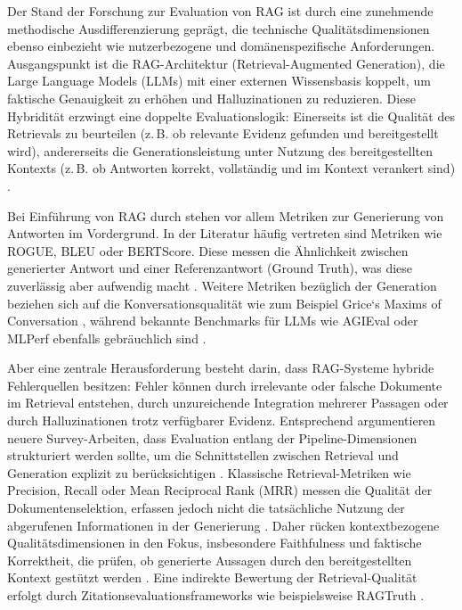 Der Stand der Forschung zur Evaluation von RAG ist durch eine zunehmende methodische Ausdifferenzierung geprägt, die technische Qualitätsdimensionen ebenso einbezieht wie nutzerbezogene und domänenspezifische Anforderungen. Ausgangspunkt ist die RAG-Architektur (Retrieval-Augmented Generation), die Large Language Models (LLMs) mit einer externen Wissensbasis koppelt, um faktische Genauigkeit zu erhöhen und Halluzinationen zu reduzieren. Diese Hybridität erzwingt eine doppelte Evaluationslogik: Einerseits ist die Qualität des Retrievals zu beurteilen (z.\,B. ob relevante Evidenz gefunden und bereitgestellt wird), andererseits die Generationsleistung unter Nutzung des bereitgestellten Kontexts (z.\,B. ob Antworten korrekt, vollständig und im Kontext verankert sind) \cite{Yu2025SurveyRAG}.

Bei Einführung von RAG durch  stehen vor allem Metriken zur Generierung von Antworten im Vordergrund. In der Literatur häufig vertreten sind Metriken wie ROGUE, BLEU oder BERTScore. Diese messen die Ähnlichkeit zwischen generierter Antwort und einer Referenzantwort (Ground Truth), was diese zuverlässig aber aufwendig macht \cite{Lewis2021RAG, Yu2025SurveyRAG}. Weitere Metriken bezüglich der Generation beziehen sich auf die Konversationsqualität wie zum Beispiel Grice‘s Maxims of Conversation \cite{Swacha2025RAGEducation}, während bekannte Benchmarks für LLMs wie AGIEval oder MLPerf ebenfalls gebräuchlich sind \cite{DanielBuch}.

Aber eine zentrale Herausforderung besteht darin, dass RAG-Systeme hybride Fehlerquellen besitzen: Fehler können durch irrelevante oder falsche Dokumente im Retrieval entstehen, durch unzureichende Integration mehrerer Passagen oder durch Halluzinationen trotz verfügbarer Evidenz. Entsprechend argumentieren neuere Survey-Arbeiten, dass Evaluation entlang der Pipeline-Dimensionen strukturiert werden sollte, um die Schnittstellen zwischen Retrieval und Generation explizit zu berücksichtigen \cite{Yu2025SurveyRAG}. Klassische Retrieval-Metriken wie Precision, Recall oder Mean Reciprocal Rank (MRR) messen die Qualität der Dokumentenselektion, erfassen jedoch nicht die tatsächliche Nutzung der abgerufenen Informationen in der Generierung \cite{Yu2025SurveyRAG}. Daher rücken kontextbezogene Qualitätsdimensionen in den Fokus, insbesondere Faithfulness und faktische Korrektheit, die prüfen, ob generierte Aussagen durch den bereitgestellten Kontext gestützt werden \cite{Roychowdhury2024RAGAS}. Eine indirekte Bewertung der Retrieval-Qualität erfolgt durch Zitationsevaluationsframeworks wie beispielsweise RAGTruth \cite{RAGtruth}.

